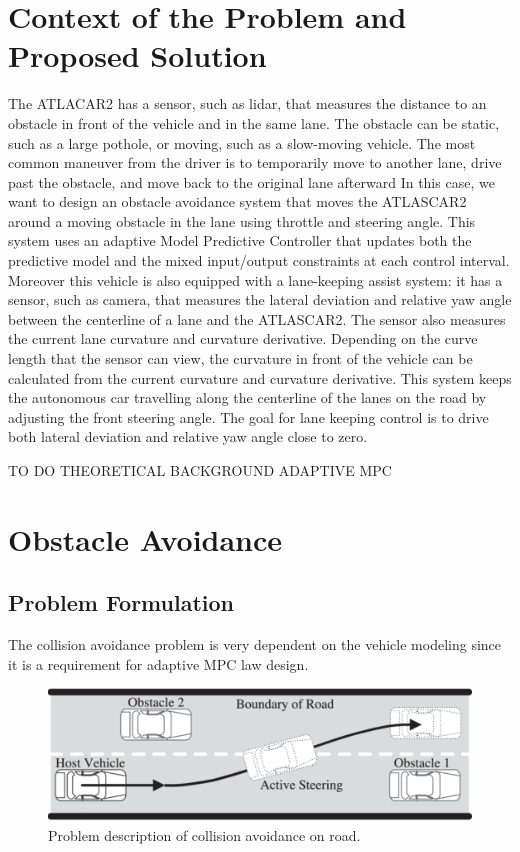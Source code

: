 \documentclass[conference, 11pt]{IEEEtran}
\begin{document}
\section{Context of the Problem and \\  Proposed Solution}
The ATLACAR2 has a sensor, such as lidar, that measures the distance to an obstacle in front of the vehicle and in the same lane. The obstacle can be static, such as a large pothole, or moving, such as a slow-moving vehicle. The most common maneuver from the driver is to temporarily move to another lane, drive past the obstacle, and move back to the original lane afterward
In this case, we want to design an obstacle avoidance system that moves the ATLASCAR2 around a moving obstacle in the lane using throttle and steering angle. This system uses an adaptive Model Predictive Controller that updates both the predictive model and the mixed input/output constraints at each control interval. Moreover this vehicle is also 
equipped with a lane-keeping assist system: it has a sensor, such as camera, that measures the lateral deviation and relative yaw angle between the centerline of a lane and the ATLASCAR2. The sensor also measures the current lane curvature and curvature derivative. Depending on the curve length that the sensor can view, the curvature in front of the vehicle can be calculated from the current curvature and curvature derivative. This system keeps the autonomous car travelling along the centerline of the lanes on the road by adjusting the front steering angle. The goal for lane keeping control is to drive both lateral deviation and relative yaw angle close to zero.

TO DO THEORETICAL BACKGROUND ADAPTIVE MPC

\section{Obstacle Avoidance}
\subsection{Problem Formulation}
The collision avoidance problem is very dependent on the vehicle modeling since it is a requirement for  adaptive MPC law design. 
\begin{figure}[!h]
	\centering
	\includegraphics[width=1\columnwidth]{./figure/obstacleAvoidance.pdf}
	\caption{Problem description of collision avoidance on road.}
	\label{fig:obstacleAvoidance}
\end{figure}
\end{document}
